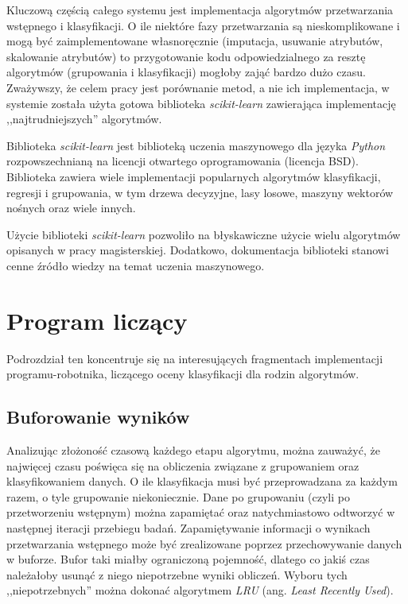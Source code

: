 \documentclass[../thesis.tex]{subfiles}
\begin{document}
Kluczową częścią całego systemu jest implementacja algorytmów przetwarzania wstępnego i klasyfikacji. O ile niektóre fazy przetwarzania są nieskomplikowane i mogą być zaimplementowane własnoręcznie (imputacja, usuwanie atrybutów, skalowanie atrybutów) to przygotowanie kodu odpowiedzialnego za resztę algorytmów (grupowania i klasyfikacji) mogłoby zająć bardzo dużo czasu. Zważywszy, że celem pracy jest porównanie metod, a nie ich implementacja, w systemie została użyta gotowa biblioteka \emph{scikit-learn} zawierająca implementację ,,najtrudniejszych'' algorytmów.

Biblioteka \emph{scikit-learn} jest biblioteką uczenia maszynowego dla języka \emph{Python} rozpowszechnianą na licencji otwartego oprogramowania (licencja BSD). Biblioteka zawiera wiele implementacji popularnych algorytmów klasyfikacji, regresji i grupowania, w tym drzewa decyzyjne, lasy losowe, maszyny wektorów nośnych oraz wiele innych.

Użycie biblioteki \emph{scikit-learn} pozwoliło na błyskawiczne użycie wielu algorytmów opisanych w pracy magisterskiej. Dodatkowo, dokumentacja biblioteki stanowi cenne źródło wiedzy na temat uczenia maszynowego.

\section{Program liczący}

Podrozdział ten koncentruje się na interesujących fragmentach implementacji programu-robotnika, liczącego oceny klasyfikacji dla rodzin algorytmów.

\subsection{Buforowanie wyników}
\label{impl:opt}

Analizując złożoność czasową każdego etapu algorytmu, można zauważyć, że najwięcej czasu poświęca się na obliczenia związane z grupowaniem oraz klasyfikowaniem danych. O ile klasyfikacja musi być przeprowadzana za każdym razem, o tyle grupowanie niekoniecznie. Dane po grupowaniu (czyli po przetworzeniu wstępnym) można zapamiętać oraz natychmiastowo odtworzyć w następnej iteracji przebiegu badań. Zapamiętywanie informacji o wynikach przetwarzania wstępnego może być zrealizowane poprzez przechowywanie danych w buforze. Bufor taki miałby ograniczoną pojemność, dlatego co jakiś czas należałoby usunąć z niego niepotrzebne wyniki obliczeń. Wyboru tych ,,niepotrzebnych'' można dokonać algorytmem \emph{LRU} (ang. \emph{Least Recently Used}).
\end{document}
